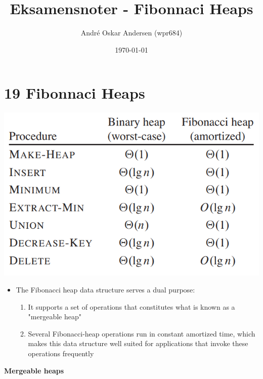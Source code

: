 \documentclass{report}
\title{Eksamensnoter - Fibonnaci Heaps}
\author{André Oskar Andersen (wpr684)}
\date{\today}
\begin{document}
\maketitle

\section*{19 Fibonnaci Heaps}
\begin{center}
    \includegraphics[width = 7 cm]{../entities/fib_heap_vs_bin_heap.png}
\end{center}
\begin{itemize}
    \item The Fibonacci heap data structure serves a dual purpose:
    \begin{enumerate}
        \item It supports a set of operations that constitutes what is known as a "mergeable heap"
        \item Several Fibonacci-heap operations run in constant amortized time, which makes this data structure well suited for applications that invoke these operations frequently
    \end{enumerate}
\end{itemize}
\textbf{Mergeable heaps}
\end{document}
